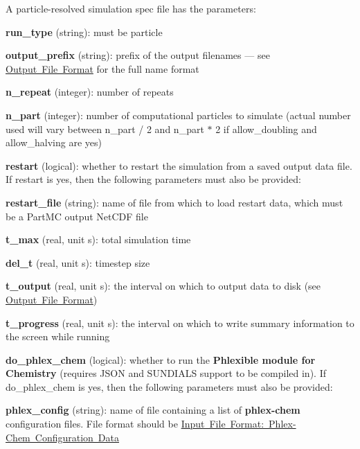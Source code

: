 A particle-\/resolved simulation spec file has the parameters\+:
\begin{DoxyItemize}
\item {\bfseries run\+\_\+type} (string)\+: must be {\ttfamily particle} 
\item {\bfseries output\+\_\+prefix} (string)\+: prefix of the output filenames --- see \mbox{\hyperlink{output_format}{Output File Format}} for the full name format
\item {\bfseries n\+\_\+repeat} (integer)\+: number of repeats
\item {\bfseries n\+\_\+part} (integer)\+: number of computational particles to simulate (actual number used will vary between {\ttfamily n\+\_\+part / 2} and {\ttfamily n\+\_\+part $\ast$ 2} if {\ttfamily allow\+\_\+doubling} and {\ttfamily allow\+\_\+halving} are {\ttfamily yes})
\item {\bfseries restart} (logical)\+: whether to restart the simulation from a saved output data file. If {\ttfamily restart} is {\ttfamily yes}, then the following parameters must also be provided\+:
\begin{DoxyItemize}
\item {\bfseries restart\+\_\+file} (string)\+: name of file from which to load restart data, which must be a Part\+MC output Net\+C\+DF file
\end{DoxyItemize}
\item {\bfseries t\+\_\+max} (real, unit s)\+: total simulation time
\item {\bfseries del\+\_\+t} (real, unit s)\+: timestep size
\item {\bfseries t\+\_\+output} (real, unit s)\+: the interval on which to output data to disk (see \mbox{\hyperlink{output_format}{Output File Format}})
\item {\bfseries t\+\_\+progress} (real, unit s)\+: the interval on which to write summary information to the screen while running
\item {\bfseries do\+\_\+phlex\+\_\+chem} (logical)\+: whether to run the {\bfseries Phlexible module for Chemistry} (requires J\+S\+ON and S\+U\+N\+D\+I\+A\+LS support to be compiled in). If {\ttfamily do\+\_\+phlex\+\_\+chem} is {\ttfamily yes}, then the following parameters must also be provided\+:
\begin{DoxyItemize}
\item {\bfseries phlex\+\_\+config} (string)\+: name of file containing a list of {\bfseries phlex-\/chem} configuration files. File format should be \mbox{\hyperlink{input_format_phlex_config}{Input File Format\+: Phlex-\/\+Chem Configuration Data}}

\end{DoxyItemize}
\end{DoxyItemize}
